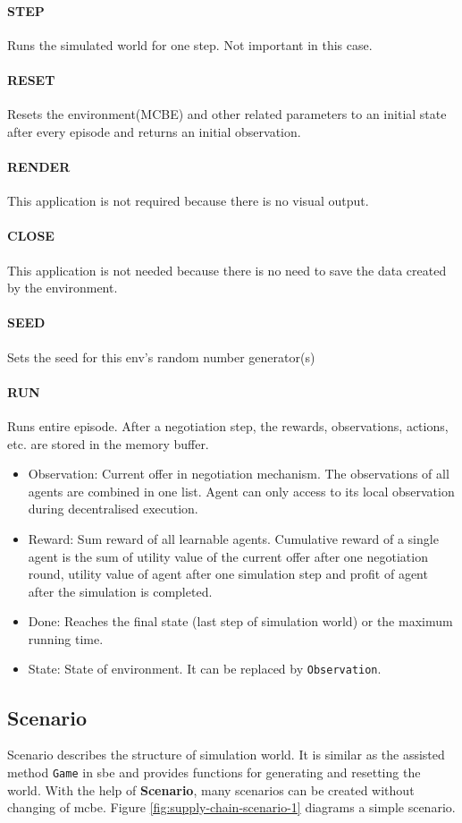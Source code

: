 \paragraph{STEP} Runs the simulated world for one step. Not important in this case. 
\paragraph{RESET} Resets the environment(MCBE) and other related parameters to an initial state after every episode and returns an initial observation.
\paragraph{RENDER} This application is not required because there is no visual output.
\paragraph{CLOSE} This application is not needed because there is no need to save the data created by
the environment.
\paragraph{SEED} Sets the seed for this env’s random number generator(s)
\paragraph{RUN} Runs entire episode. After a negotiation step, the rewards, observations, actions, etc. are stored in the memory buffer. 
\begin{itemize}
	\item Observation: Current offer in negotiation mechanism. The observations of all agents are combined in one list. Agent can only access to its local observation during decentralised execution.
	\item Reward: Sum reward of all learnable agents. Cumulative reward of a single agent is the sum of utility value of the current offer after one negotiation round, utility value of agent after one simulation step and profit of agent after the simulation is completed.
	\item Done: Reaches the final state (last step of simulation world) or the maximum running time.
	\item State: State of environment. It can be replaced by \texttt{Observation}.
\end{itemize}

\subsection{Scenario} \label{scenario}
Scenario describes the structure of simulation world. It is similar as the assisted method \texttt{Game} in \gls{sbe} and provides functions for generating and resetting the world. With the help of \textbf{Scenario}, many scenarios can be created without changing of \gls{mcbe}. Figure \ref{fig:supply-chain-scenario-1} diagrams a simple scenario.

